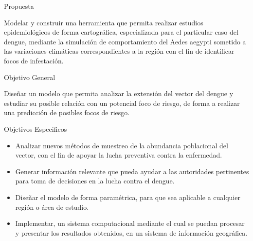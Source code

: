 \begin{frame}[c]{Propuesta}
    \begin{center}
    Modelar y construir una herramienta que permita realizar estudios epidemiológicos de forma
    cartográfica, especializada para el particular caso del dengue, mediante la simulación de
    comportamiento del Aedes aegypti sometido a las variaciones climáticas correspondientes a la
    región con el fin de identificar focos de infestación.
    \end{center}
\end{frame}


\begin{frame}[c]{Objetivo General}
    \begin{center}
    Diseñar un modelo que permita analizar la extensión del vector del dengue y estudiar su posible
    relación con un potencial foco de riesgo, de forma a realizar una predicción de posibles focos
    de riesgo.
    \end{center}
\end{frame}


\begin{frame}[t]{Objetivos Especificos}
    \begin{center}

        \begin{itemize}
        \item Analizar nuevos métodos de muestreo de la abundancia poblacional del vector, con el fin de apoyar la lucha preventiva contra la enfermedad.

        \item Generar información relevante que pueda ayudar a las autoridades pertinentes para toma de decisiones en la lucha contra el dengue.

        \item Diseñar el modelo de forma paramétrica, para que sea aplicable a cualquier región o área de estudio.

        \item Implementar, un sistema computacional mediante el cual se puedan procesar y presentar los resultados obtenidos, en un sistema de información geográfica.
        \end{itemize}
    \end{center}
\end{frame}
